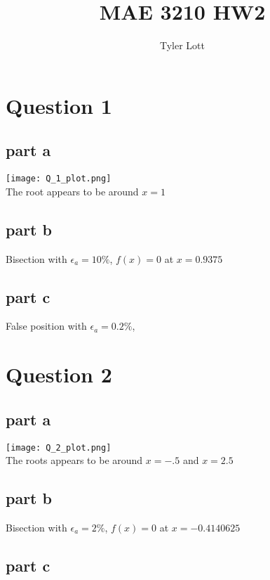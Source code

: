 \documentclass[11pt]{article} %
\title{MAE 3210  HW2}
\author{Tyler Lott}
\begin{document}
\maketitle

\section{Question 1}

\subsection{part a}

\texttt{[image: Q\_1\_plot.png]} \\
The root appears to be around $x=1$

\subsection{part b}

Bisection with $\epsilon_a = 10\%$, $ f(x) = 0$ at $ x = 0.9375 $

\subsection{part c}

False position with $\epsilon_a = 0.2\%$,

\section{Question 2}

\subsection{part a}

\texttt{[image: Q\_2\_plot.png]} \\
The roots appears to be around $x=-.5$ and $x=2.5$

\subsection{part b}

Bisection with $\epsilon_a = 2\%$,  $ f(x) = 0$ at $x = -0.4140625$

\subsection{part c}
\end{document}
